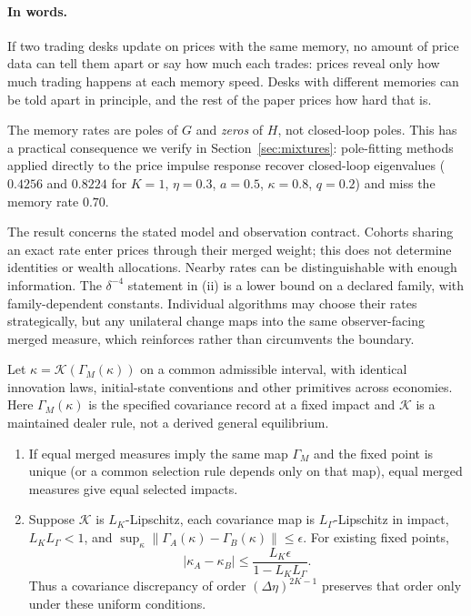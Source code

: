 \paragraph{In words.} If two trading desks update on prices with the same memory, no amount of price data can tell them apart or say how much each trades: prices reveal only how much trading happens at each memory speed. Desks with different memories can be told apart in principle, and the rest of the paper prices how hard that is.


The memory rates are poles of $G$ and \emph{zeros} of $H$, not closed-loop poles. This has a practical consequence we verify in Section~\ref{sec:mixtures}: pole-fitting methods applied directly to the price impulse response recover closed-loop eigenvalues ($0.4256$ and $0.8224$ for $K=1$, $\eta=0.3$, $a=0.5$, $\kappa=0.8$, $q=0.2$) and miss the memory rate $0.70$.

\begin{remark}[Scope]\label{rem:scope}
The result concerns the stated model and observation contract. Cohorts sharing an exact rate enter prices through their merged weight; this does not determine identities or wealth allocations. Nearby rates can be distinguishable with enough information. The $\delta^{-4}$ statement in (ii) is a lower bound on a declared family, with family-dependent constants. Individual algorithms may choose their rates strategically, but any unilateral change maps into the same observer-facing merged measure, which reinforces rather than circumvents the boundary.
\end{remark}

\begin{proposition}\label{prop:endogenous_kappa}
Let $\kappa=\mathcal K(\Gamma_M(\kappa))$ on a common admissible interval, with identical innovation laws, initial-state conventions and other primitives across economies. Here $\Gamma_M(\kappa)$ is the specified covariance record at a fixed impact and $\mathcal K$ is a maintained dealer rule, not a derived general equilibrium.
\begin{enumerate}[label=(\roman*)]
\item If equal merged measures imply the same map $\Gamma_M$ and the fixed point is unique (or a common selection rule depends only on that map), equal merged measures give equal selected impacts.
\item Suppose $\mathcal K$ is $L_K$-Lipschitz, each covariance map is $L_\Gamma$-Lipschitz in impact, $L_KL_\Gamma<1$, and $\sup_\kappa\|\Gamma_A(\kappa)-\Gamma_B(\kappa)\|\le\epsilon$. For existing fixed points,
\begin{equation}\label{eq:kappa_closeness}
 |\kappa_A-\kappa_B|\le\frac{L_K\epsilon}{1-L_KL_\Gamma}.
\end{equation}
Thus a covariance discrepancy of order $(\Delta\eta)^{2K-1}$ preserves that order only under these uniform conditions.
\end{enumerate}
\end{proposition}

